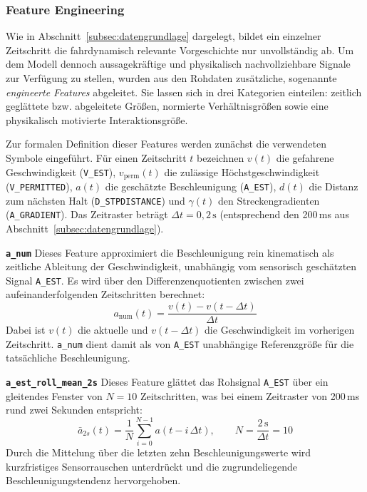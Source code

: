 \subsubsection{Feature Engineering}
\label{subsubsec:feature_engineering}

Wie in Abschnitt~\ref{subsec:datengrundlage} dargelegt, bildet ein einzelner Zeitschritt die fahrdynamisch relevante Vorgeschichte nur unvollständig ab. Um dem Modell dennoch aussagekräftige und physikalisch nachvollziehbare Signale zur Verfügung zu stellen, wurden aus den Rohdaten zusätzliche, sogenannte \emph{engineerte Features} abgeleitet. Sie lassen sich in drei Kategorien einteilen: zeitlich geglättete bzw. abgeleitete Größen, normierte Verhältnisgrößen sowie eine physikalisch motivierte Interaktionsgröße.

Zur formalen Definition dieser Features werden zunächst die verwendeten Symbole eingeführt. Für einen Zeitschritt $t$ bezeichnen $v(t)$ die gefahrene Geschwindigkeit (\texttt{V\_EST}), $v_{\text{perm}}(t)$ die zulässige Höchstgeschwindigkeit (\texttt{V\_PERMITTED}), $a(t)$ die geschätzte Beschleunigung (\texttt{A\_EST}), $d(t)$ die Distanz zum nächsten Halt (\texttt{D\_STPDISTANCE}) und $\gamma(t)$ den Streckengradienten (\texttt{A\_GRADIENT}). Das Zeitraster beträgt $\Delta t = 0{,}2\,\text{s}$ (entsprechend den 200\,ms aus Abschnitt~\ref{subsec:datengrundlage}).

\medskip
\noindent\textbf{\texttt{a\_num}} Dieses Feature approximiert die Beschleunigung rein kinematisch als zeitliche Ableitung der Geschwindigkeit, unabhängig vom sensorisch geschätzten Signal \texttt{A\_EST}. Es wird über den Differenzenquotienten zwischen zwei aufeinanderfolgenden Zeitschritten berechnet:
\begin{equation}
    a_{\text{num}}(t) = \frac{v(t) - v(t - \Delta t)}{\Delta t}
    \label{eq:a_num}
\end{equation}
Dabei ist $v(t)$ die aktuelle und $v(t-\Delta t)$ die Geschwindigkeit im vorherigen Zeitschritt. \texttt{a\_num} dient damit als von \texttt{A\_EST} unabhängige Referenzgröße für die tatsächliche Beschleunigung.

\medskip
\noindent\textbf{\texttt{a\_est\_roll\_mean\_2s}} Dieses Feature glättet das Rohsignal \texttt{A\_EST} über ein gleitendes Fenster von $N=10$ Zeitschritten, was bei einem Zeitraster von 200\,ms rund zwei Sekunden entspricht:
\begin{equation}
    \bar{a}_{2s}(t) = \frac{1}{N}\sum_{i=0}^{N-1} a(t - i\,\Delta t), \qquad N = \frac{2\,\text{s}}{\Delta t} = 10
    \label{eq:a_roll_mean}
\end{equation}
Durch die Mittelung über die letzten zehn Beschleunigungswerte wird kurzfristiges Sensorrauschen unterdrückt und die zugrundeliegende Beschleunigungstendenz hervorgehoben.

